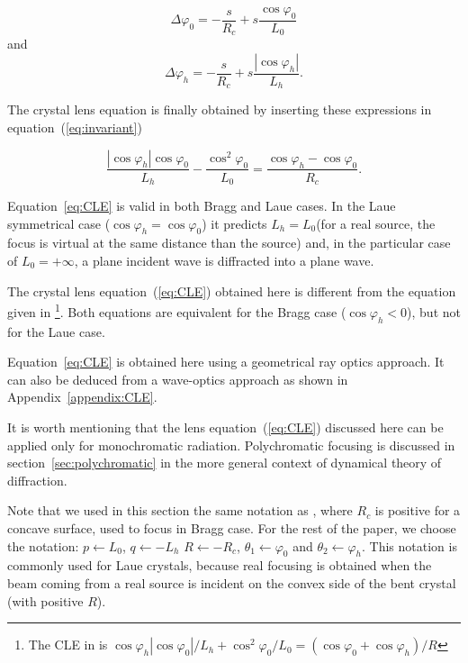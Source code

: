 \documentclass[preprint]{iucr}              %
\begin{document}
\begin{equation}
\label{eq:angles}
\Delta \varphi_0 =  - \frac{s}{R_c} + s \frac{\cos\varphi_0}{L_0}
\end{equation}
and 
\begin{equation}
\label{eq:angles2}
\Delta \varphi_h = - \frac{s}{R_c} +  s \frac{|\cos\varphi_h|}{L_h}.
\end{equation}

The crystal lens equation is finally obtained by inserting these expressions in equation~(\ref{eq:invariant})

\begin{equation}
\label{eq:CLE}
\frac{|\cos\varphi_h| \cos\varphi_0}{L_h} - \frac{\cos^2\varphi_0}{L_0} = \frac{\cos\varphi_h - \cos\varphi_0}{R_c}.
\end{equation}


Equation~\ref{eq:CLE} is valid in both Bragg and Laue cases. In the Laue symmetrical case ($\cos\varphi_h=\cos\varphi_0$) it predicts $L_h=L_0$(for a real source, the focus is virtual at the same distance than the source) and, in the particular case of $L_0=+\infty$, a plane incident wave is diffracted into a plane wave.

The crystal lens equation~(\ref{eq:CLE}) obtained here is different from the equation given in \cite{CK}\footnote{The CLE in \cite{CK} is 
$
\cos\varphi_h |\cos\varphi_0|/L_h + \cos^2\varphi_0/L_0 = (\cos\varphi_0 + \cos\varphi_h)/R 
$}. Both equations are equivalent for the Bragg case ($\cos\varphi_h<0$), but not for the Laue case.

Equation~\ref{eq:CLE} is obtained here using a geometrical ray optics approach. It can also be deduced from a wave-optics approach as shown in Appendix~\ref{appendix:CLE}. 

It is worth mentioning that the lens equation~(\ref{eq:CLE}) discussed here can be applied only for monochromatic radiation. Polychromatic focusing is discussed in section~\ref{sec:polychromatic} in the more general context of dynamical theory of diffraction.

Note that we used in this section the same notation as \cite{CK}, where $R_c$ is positive for a concave surface, used to focus in Bragg case. For the rest of the paper, we choose the notation: $p \leftarrow L_0$, $q \leftarrow -L_h$ $R \leftarrow -R_c$, $\theta_1 \leftarrow \varphi_0$ and $\theta_2 \leftarrow \varphi_h$.
This notation is commonly used for Laue crystals, because real focusing is obtained when the beam coming from a real source is incident on the convex side of the bent crystal (with positive $R$).
\end{document}
